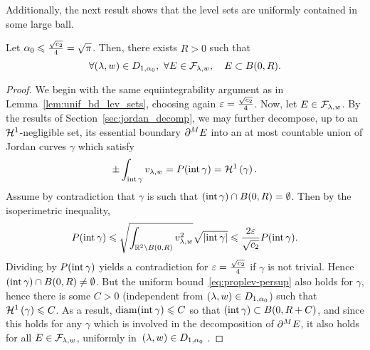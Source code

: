 Additionally, the next result shows that the level sets are uniformly contained in some large ball.
\begin{lem}\label{lem:largeball}%
  Let $\alpha_0\leqslant \frac{\sqrt{c_2}}{4}=\sqrt{\pi}$. Then, there exists $R>0$ such that
\begin{equation*}
  \forall (\lambda,w)\in D_{1,\alpha_0},\  \forall E\in \mathcal{F}_{\lambda,w},\quad E\subset B(0,R).
\end{equation*}
\end{lem}


\begin{proof} 
We begin with the same equiintegrability argument as in Lemma~\ref{lem:unif_bd_lev_sets}, choosing again $\varepsilon=\frac{\sqrt{c_2}}{4}$.
Now, let $E\in \mathcal{F}_{\lambda,w}$. By the results of Section~\ref{sec:jordan_decomp}, we may further decompose, up to an $\mathcal{H}^1$-negligible set, its essential boundary  $\partial^M E$  into an at most countable union of Jordan curves $\gamma$ which satisfy
\begin{equation*}
  \pm\int_{\operatorname{int} \gamma}v_{\lambda,w} = P(\operatorname{int} \gamma) = \mathcal{H}^{1}\left({\gamma}\right).
\end{equation*}
Assume by contradiction that $\gamma$ is such that $(\operatorname{int} \gamma)\cap B(0,R)=\emptyset$. Then by the isoperimetric inequality,
\begin{align*}
  P(\operatorname{int} \gamma)\leqslant \sqrt{\int_{\mathbb{R}^2\setminus B(0,R)}v_{\lambda,w}^2}\sqrt{\left| \operatorname{int} \gamma \right|}\leqslant  \frac{2\varepsilon}{\sqrt{c_2}} P(\operatorname{int} \gamma). 
\end{align*}
Dividing by $P(\operatorname{int} \gamma)$ yields a contradiction for $\varepsilon=\frac{\sqrt{c_2}}{4}$ if $\gamma$ is not trivial.
Hence $(\operatorname{int} \gamma)\cap B(0,R)\neq\emptyset$.
But the uniform bound~\eqref{eq:proplev-persup} also holds for $\gamma$, hence there is some $C>0$ (independent from $(\lambda,w)\in D_{1,\alpha_0}$) such that $\mathcal{H}^{1}\left({\gamma}\right)\leqslant C$. As a result, $\mathrm{diam} (\operatorname{int} \gamma)\leqslant C$ so that $(\operatorname{int} \gamma)\subset B(0,R+C)$, and since this holds for any $\gamma$ which is involved in the decomposition of $\partial^M E$, it also holds for all $E\in \mathcal{F}_{\lambda,w}$, uniformly in~$(\lambda,w)\in D_{1,\alpha_0}$ . 
\end{proof}


